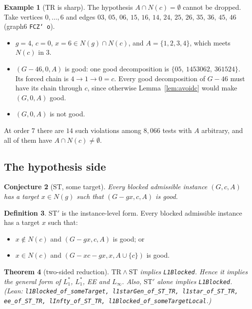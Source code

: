 \documentclass[11pt]{amsart}
\newtheorem{theorem}{Theorem}[section]
\newtheorem{conjecture}[theorem]{Conjecture}
\theoremstyle{definition}
\newtheorem{definition}[theorem]{Definition}
\newtheorem{example}[theorem]{Example}
\newcommand{\lean}[1]{\quad\emph{(Lean: \texttt{#1}.)}}
\newcommand{\TR}{\mathrm{TR}}
\newcommand{\ST}{\mathrm{ST}}
\begin{document}
\begin{example}[$\TR$ is sharp]\label{ex:trsharp}
The hypothesis $A\cap N(c)=\emptyset$ cannot be dropped. Take vertices $0,\dots,6$ and edges $03$,
$05$, $06$, $15$, $16$, $14$, $24$, $25$, $26$, $35$, $36$, $45$, $46$ (graph6 \texttt{FCZ\char`~o}).
\begin{itemize}
\item $g=4$, $c=0$, $x=6\in N(g)\cap N(c)$, and $A=\{1,2,3,4\}$, which meets $N(c)$ in $3$.
\item $(G-46,0,A)$ is good: one good decomposition is $\{05,\ 1453062,\ 361524\}$.
Its forced chain is $4\to1\to0=c$. Every good decomposition of $G-46$ must have its chain through
$c$, since otherwise Lemma~\ref{lem:avoidc} would make $(G,0,A)$ good.
\item $(G,0,A)$ is not good.
\end{itemize}
At order $7$ there are $14$ such violations among $8{,}066$ tests with $A$ arbitrary, and all of them
have $A\cap N(c)\neq\emptyset$.
\end{example}

\subsection{The hypothesis side}

\begin{conjecture}[$\ST$, some target]\label{conj:st}
Every blocked admissible instance $(G,c,A)$ has a target $x\in N(g)$ such that $(G-gx,c,A)$ is good.
\end{conjecture}

\begin{definition}
$\ST'$ is the instance-level form. Every blocked admissible instance has a target $x$ such that:
\begin{itemize}
\item $x\notin N(c)$ and $(G-gx,c,A)$ is good; or
\item $x\in N(c)$ and $(G-xc-gx,x,A\cup\{c\})$ is good.
\end{itemize}
\end{definition}

\begin{theorem}[two-sided reduction]\label{thm:two}
$\TR\wedge\ST$ implies \texttt{L1Blocked}. Hence it implies the general form of $L_1^*$, $L_1^*$, EE
and $L_\infty$. Also, $\ST'$ alone implies \texttt{L1Blocked}.
\lean{l1Blocked\_of\_someTarget, l1starGen\_of\_ST\_TR, l1star\_of\_ST\_TR, ee\_of\_ST\_TR,
lInfty\_of\_ST\_TR, l1Blocked\_of\_someTargetLocal}
\end{theorem}
\end{document}
